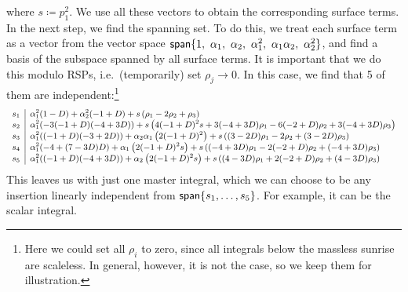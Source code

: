 where $s\coloneqq p_1^2$.
We use all these vectors to obtain the corresponding surface terms. 
In the next step, we find the spanning set.
To do this, we treat each surface term as a vector from the vector space 
$\mathsf{span}\{1,~ \alpha_1,~ \alpha_2,~\alpha_1^2,~\alpha_1\alpha_2,~\alpha_2^2\}$,
and find a basis of the subspace spanned by all surface terms. 
It is important that we do this modulo RSPs, i.e.\ (temporarily) set $\rho_j\to 0$.
In this case, we find that 5 of them are independent:\footnote{
  Here we could set all $\rho_i$ to zero, since all integrals below the massless sunrise are scaleless.
  In general, however, it is not the case, so we keep them for illustration.
}
\begin{equation*}
  \small
  \begin{array}{l|l}
    s_1 & \alpha _1^2 (1-D)+\alpha _2^2 (-1+D)+s \left(\rho _1-2 \rho _2+\rho _3\right) \\
    s_2 & \alpha _1^2 (-3 (-1+D) (-4+3 D))+s \left(4 (-1+D)^2 s+3 (-4+3 D) \rho _1-6 (-2+D) \rho _2+3 (-4+3 D) \rho _3\right) \\
    s_3 & \alpha _1^2 ((-1+D) (-3+2 D))+\alpha _2 \alpha _1 \left(2 (-1+D)^2\right)+s \left((3-2 D) \rho _1-2 \rho _2+(3-2 D) \rho _3\right) \\
    s_4 & \alpha _1^2 (-4+(7-3 D) D)+\alpha _1 \left(2 (-1+D)^2 s\right)+s \left((-4+3 D) \rho _1-2 (-2+D) \rho _2+(-4+3 D) \rho _3\right) \\
    s_5 & \alpha _1^2 ((-1+D) (-4+3 D))+\alpha _2 \left(2 (-1+D)^2 s\right)+s \left((4-3 D) \rho _1+2 (-2+D) \rho _2+(4-3 D) \rho _3\right) \\
  \end{array}
\end{equation*}
This leaves us with just one master integral, which
we can choose to be any insertion linearly independent from $\mathsf{span}\{s_1,\ldots{},s_5\}$.
For example, it can be the scalar integral.






